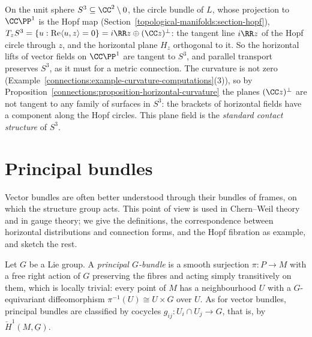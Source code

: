 \begin{example}
\begin{enumerate}
\[\]
On the unit sphere $S^3 \subseteq \CC^2 \setminus 0$, the circle bundle of $L$, whose projection to $\CC\PP^1$ is the Hopf map (Section~\ref{topological-manifolds:section-hopf}),
$T_zS^3 = \{u : \operatorname{Re}\langle u, z\rangle = 0\} = i\RR z \oplus (\CC z)^\perp$: the tangent line $i\RR z$ of the Hopf circle through $z$, and the horizontal plane $H_z$
orthogonal to it. So the horizontal lifts of vector fields on $\CC\PP^1$ are tangent to $S^3$, and parallel transport preserves $S^3$, as it must for a metric connection. The curvature is
not zero (Example~\ref{connections:example-curvature-computations}(3)), so by Proposition~\ref{connections:proposition-horizontal-curvature} the planes $(\CC z)^\perp$ are not tangent to any
family of surfaces in $S^3$: the brackets of horizontal fields have a component along the Hopf circles. This plane field is the \emph{standard contact structure} of $S^3$.
\end{enumerate}
\end{example}
\section{Principal bundles}\label{connections:section-principal}

Vector bundles are often better understood through their bundles of frames, on which the structure group acts. This point of view is used in Chern--Weil theory and in gauge
theory; we give the definitions, the correspondence between horizontal distributions and connection forms, and the Hopf fibration as
example, and sketch the rest.

\begin{definition}\label{connections:definition-principal-bundle}
Let $G$ be a Lie group. A \emph{principal $G$-bundle} is a smooth surjection $\pi \colon P \to M$ with a free right action of $G$ preserving the fibres and acting simply transitively on them, which is locally
trivial: every point of $M$ has a neighbourhood $U$ with a $G$-equivariant diffeomorphism $\pi^{-1}(U) \cong U \times G$ over $U$. As for vector bundles, principal bundles are classified by cocycles
$g_{ij} \colon U_i \cap U_j \to G$, that is, by $\check{H}^1(M, \underline{G})$.
\end{definition}

